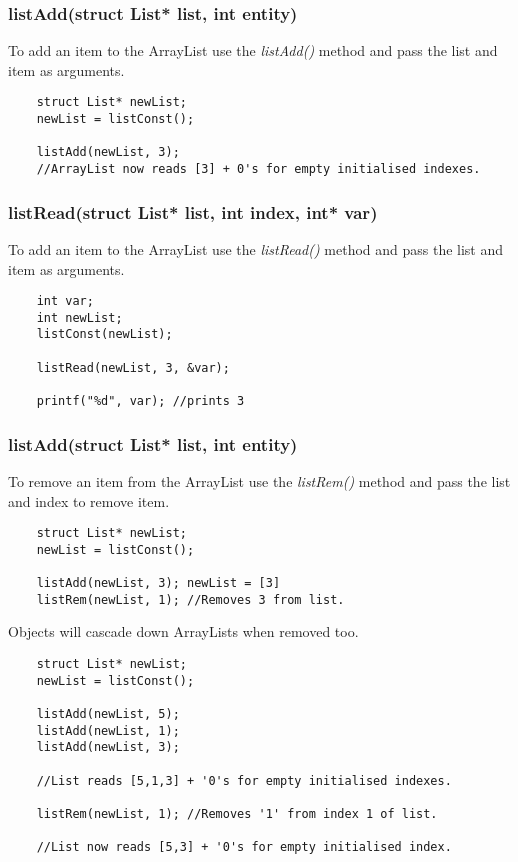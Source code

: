 \documentclass{article}
\begin{document}
\subsubsection*{listAdd(struct List* list, int entity)}
To add an item to the ArrayList use the \emph{listAdd()} method and pass the list and item as arguments.
\begin{lstlisting}
    struct List* newList;
    newList = listConst();

    listAdd(newList, 3);
    //ArrayList now reads [3] + 0's for empty initialised indexes.
\end{lstlisting}

\subsubsection*{listRead(struct List* list, int index, int* var)}
To add an item to the ArrayList use the \emph{listRead()} method and pass the list and item as arguments.
\begin{lstlisting}
    int var;
    int newList;
    listConst(newList);

    listRead(newList, 3, &var);

    printf("%d", var); //prints 3
\end{lstlisting}

\subsubsection*{listAdd(struct List* list, int entity)}
To remove an item from the ArrayList use the \emph{listRem()} method and pass the list and index to remove item.
\begin{lstlisting}
    struct List* newList;
    newList = listConst();

    listAdd(newList, 3); newList = [3]
    listRem(newList, 1); //Removes 3 from list.
\end{lstlisting}
Objects will cascade down ArrayLists when removed too.
\begin{lstlisting}
    struct List* newList;
    newList = listConst();

    listAdd(newList, 5);
    listAdd(newList, 1);
    listAdd(newList, 3);

    //List reads [5,1,3] + '0's for empty initialised indexes.

    listRem(newList, 1); //Removes '1' from index 1 of list.

    //List now reads [5,3] + '0's for empty initialised index.
\end{lstlisting}
\end{document}
